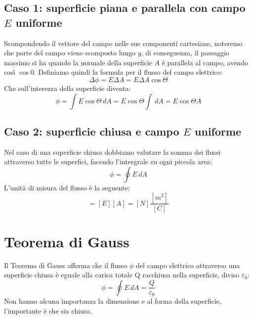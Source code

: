             \subsection{Caso 1: superficie piana e parallela con campo $E$
            uniforme} Scompondendo il vettore del campo nelle sue componenti 
            cartesiane, noteremo che parte del campo viene scomposto lungo $y$,
            di conseguenza, il passaggio massimo si ha quando la normale della 
            superficie $A$ è parallela al campo, avendo così $\cos0$. Definiamo
            quindi la formula per il flusso del campo elettrico:
                \begin{equation}
                    \Delta\phi = E \Delta A = E \Delta A \cos\Theta 
                \end{equation}
            Che sull'interezza della superficie diventa:
                \begin{equation}
                \phi = \int E\cos\Theta \,dA  = E\cos\Theta\int\,dA = E\cos
                \Theta A 
                \end{equation}
            \subsection{Caso 2: superficie chiusa e campo $E$ uniforme} Nel 
            caso di una superficie chiusa dobbiamo valutare la somma dei flussi
            attraverso tutte le superfici, facendo l'intergrale su ogni piccola
            area:
                \begin{equation}
                    \phi = \oint E \,dA
                \end{equation}
        L'unità di misura del flusso è la seguente:
                \begin{equation*}
                    [\phi] = [E][A] = [N] \frac{[m^2]}{[C]}
                \end{equation*}
         
        \section{Teorema di Gauss} Il Teorema di Gauss afferma che il flusso 
        $\phi$ del campo elettrico attraverso una superficie chiusa è eguale
        alla carica totale Q racchiusa nella superficie, diviso $\varepsilon_0$:
            \begin{equation}
                \phi = \oint E \, dA = \frac{Q}{\varepsilon_0}
            \end{equation}
        Non hanno alcuna importanza la dimensione e al forma della superficie,
        l'importante è che sia chiusa.

